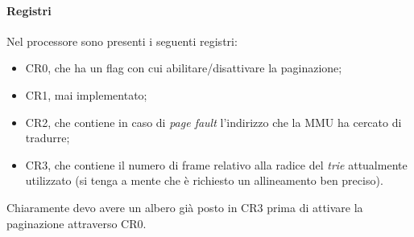 \paragraph{Registri} Nel processore sono presenti i seguenti registri:
\begin{itemize}
	\item CR0, che ha un flag con cui abilitare/disattivare la paginazione;
	\item CR1, mai implementato;
	\item CR2, che contiene in caso di \emph{page fault} l'indirizzo che la MMU ha cercato di tradurre;
	\item CR3, che contiene il numero di frame relativo alla radice del \emph{trie} attualmente utilizzato (si tenga a mente che è richiesto un allineamento ben preciso).
\end{itemize}
Chiaramente devo avere un albero già posto in CR3 prima di attivare la paginazione attraverso CR0.

